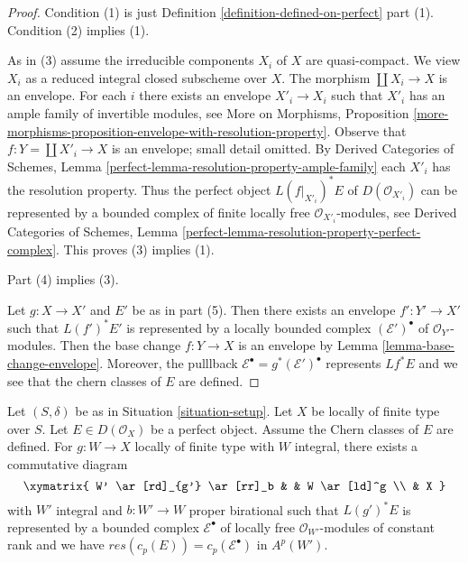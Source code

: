 \begin{proof}
Condition (1) is just Definition \ref{definition-defined-on-perfect} part (1).
Condition (2) implies (1).

\medskip\noindent
As in (3) assume the irreducible components $X_i$ of $X$ are quasi-compact.
We view $X_i$ as a reduced integral closed subscheme over $X$.
The morphism $\coprod X_i \to X$ is an envelope. For each $i$ there
exists an envelope $X'_i \to X_i$ such that $X'_i$ has an ample family
of invertible modules, see More on Morphisms, Proposition
\ref{more-morphisms-proposition-envelope-with-resolution-property}.
Observe that $f : Y = \coprod X'_i \to X$ is an envelope; small detail omitted.
By Derived Categories of Schemes, Lemma
\ref{perfect-lemma-resolution-property-ample-family}
each $X'_i$ has the resolution property.
Thus the perfect object $L(f|_{X'_i})^*E$ of $D(\mathcal{O}_{X'_i})$
can be represented by a bounded
complex of finite locally free $\mathcal{O}_{X'_i}$-modules, see
Derived Categories of Schemes, Lemma
\ref{perfect-lemma-resolution-property-perfect-complex}.
This proves (3) implies (1).

\medskip\noindent
Part (4) implies (3).

\medskip\noindent
Let $g : X \to X'$ and $E'$ be as in part (5). Then there exists an
envelope $f' : Y' \to X'$ such that $L(f')^*E'$ is represented by a
locally bounded complex $(\mathcal{E}')^\bullet$ of $\mathcal{O}_{Y'}$-modules.
Then the base change $f : Y \to X$ is an envelope by
Lemma \ref{lemma-base-change-envelope}. Moreover, the pulllback
$\mathcal{E}^\bullet = g^*(\mathcal{E}')^\bullet$ represents $Lf^*E$
and we see that the chern classes of $E$ are defined.
\end{proof}

\begin{lemma}
\label{lemma-chern-classes-computed}
Let $(S, \delta)$ be as in Situation \ref{situation-setup}.
Let $X$ be locally of finite type over $S$. Let $E \in D(\mathcal{O}_X)$
be a perfect object. Assume the Chern classes of $E$ are defined.
For $g : W \to X$ locally of finite type with $W$ integral, there exists
a commutative diagram
$$
\xymatrix{
W' \ar[rd]_{g'} \ar[rr]_b & & W \ar[ld]^g \\
& X
}
$$
with $W'$ integral and $b : W' \to W$ proper birational such that $L(g')^*E$
is represented by a bounded complex $\mathcal{E}^\bullet$ of locally free
$\mathcal{O}_{W'}$-modules of constant rank and we have
$res(c_p(E)) = c_p(\mathcal{E}^\bullet)$ in $A^p(W')$.
\end{lemma}

